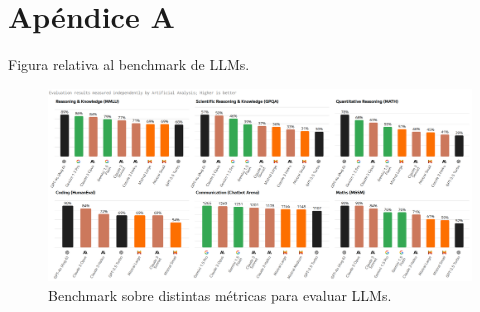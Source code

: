 

\chapter{Apéndice A}
\label{apendize-a}

Figura relativa al benchmark de LLMs.

\begin{figure}[!h]
\centering
\includegraphics[width=1.1\textwidth,angle=90]{figuras/capitulo6/benchmark.png}
\caption{Benchmark sobre distintas métricas para evaluar LLMs. \citep{artificialanalysis}}
\label{fig:benchmark}
\end{figure}

